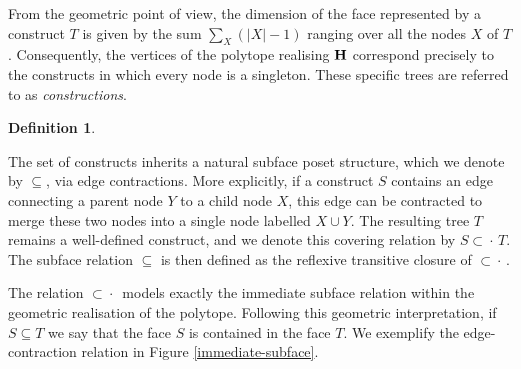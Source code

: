 \documentclass{article}
\theoremstyle{plain}
\theoremstyle{definition}
\newtheorem{definition}[thm]{Definition}
\newcommand{\hyper}[1]{{\bf #1}}
\newcommand{\subsetdot}{{\subset\!\!\!\!\cdot\,}}
\begin{document}
From the geometric point of view, the dimension of the face represented by a construct $T$ is given by the sum $\sum_X (|X|-1)$ ranging over all the nodes $X$ of $T$. Consequently, the vertices of the polytope realising $\hyper{H}$ correspond precisely to the constructs in which every node is a singleton. These specific trees are referred to as {\em constructions}.

\smallskip

\begin{definition} \label{rqueSubfaces}

The set of constructs inherits a natural subface poset structure, which we denote by $\subseteq$, via edge contractions. More explicitly, if a construct $S$ contains an edge connecting a parent node $Y$ to a child node $X$, this edge can be contracted to merge these two nodes into a single node labelled $X \cup Y$. The resulting tree $T$ remains a well-defined construct, and we denote this covering relation by $S \subsetdot T$. The subface relation $\subseteq$ is then defined as the reflexive transitive closure of $\subsetdot$.\end{definition}

The relation $\subsetdot$ models exactly the immediate subface relation within the geometric realisation of the polytope. Following this geometric interpretation, if $S \subseteq T$ we say that the face $S$ is contained in the face $T$. We exemplify the edge-contraction relation in Figure \ref{immediate-subface}.
\end{document}
